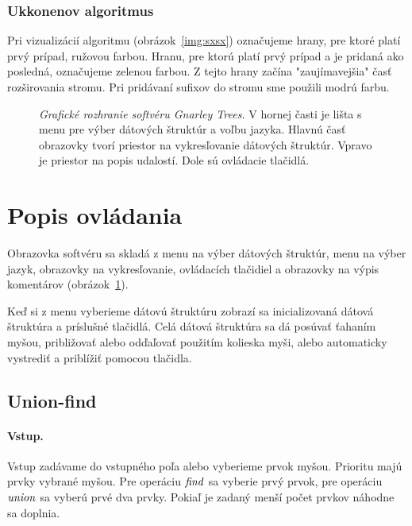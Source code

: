 \subsubsection{Ukkonenov algoritmus}

Pri vizualizácií algoritmu (obrázok~\ref{img:sxsx}) označujeme hrany, pre 
ktoré platí prvý prípad, 
ružovou farbou. Hranu, pre ktorú platí prvý prípad a je pridaná ako posledná, 
označujeme zelenou farbou. Z tejto hrany začína "zaujímavejšia" časť 
rozširovania stromu. Pri pridávaní sufixov do stromu sme použili modrú farbu.

\begin{figure}
\centering
{}
\caption{\emph{Grafické rozhranie softvéru Gnarley Trees.} V hornej časti je 
lišta s menu pre výber dátových štruktúr a voľbu jazyka. Hlavnú časť 
obrazovky tvorí priestor na vykresľovanie dátových štruktúr. Vpravo je 
priestor na popis udalostí. Dole sú ovládacie tlačidlá.}
\label{img:gui}
\end{figure}

\newpage
\section{Popis ovládania}\label{sec:im:im}

Obrazovka softvéru sa skladá z menu na výber dátových štruktúr, menu na výber 
jazyk, obrazovky na vykresľovanie, ovládacích tlačidiel a obrazovky na výpis 
komentárov (obrázok~\ref{img:gui}).

Keď si z menu vyberieme dátovú štruktúru zobrazí sa inicializovaná dátová 
štruktúra a príslušné tlačidlá. Celá dátová štruktúra sa dá posúvať ťahaním 
myšou, približovať alebo odďaľovať použitím kolieska myši, alebo automaticky 
vystrediť a priblížiť pomocou tlačidla.

\subsection{Union-find}

\paragraph{Vstup.} Vstup zadávame do vstupného poľa alebo vyberieme prvok 
myšou. Prioritu majú prvky vybrané myšou. Pre operáciu $\mathop{\mathit{find}}$ sa vyberie prvý 
prvok, pre operáciu $\mathop{\mathit{union}}$ sa vyberú prvé dva prvky. Pokiaľ je zadaný menší 
počet prvkov náhodne sa doplnia. 

